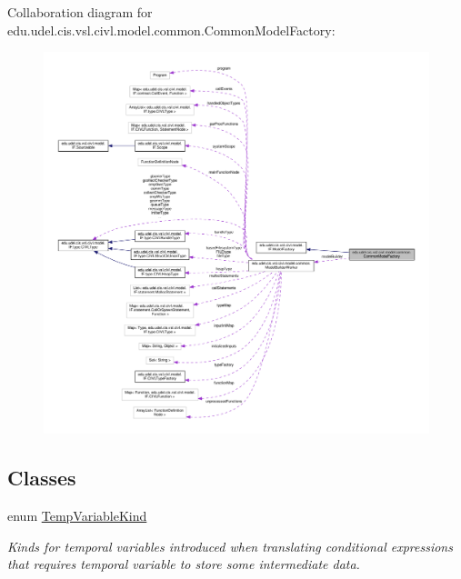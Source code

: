 Collaboration diagram for edu.\+udel.\+cis.\+vsl.\+civl.\+model.\+common.\+Common\+Model\+Factory\+:
\nopagebreak
\begin{figure}[H]
\begin{center}
\leavevmode
\includegraphics[width=350pt]{classedu_1_1udel_1_1cis_1_1vsl_1_1civl_1_1model_1_1common_1_1CommonModelFactory__coll__graph}
\end{center}
\end{figure}
\subsection*{Classes}
\begin{DoxyCompactItemize}
\item 
enum \hyperlink{enumedu_1_1udel_1_1cis_1_1vsl_1_1civl_1_1model_1_1common_1_1CommonModelFactory_1_1TempVariableKind}{Temp\+Variable\+Kind}
\begin{DoxyCompactList}\small\item\em Kinds for temporal variables introduced when translating conditional expressions that requires temporal variable to store some intermediate data. \end{DoxyCompactList}\end{DoxyCompactItemize}
